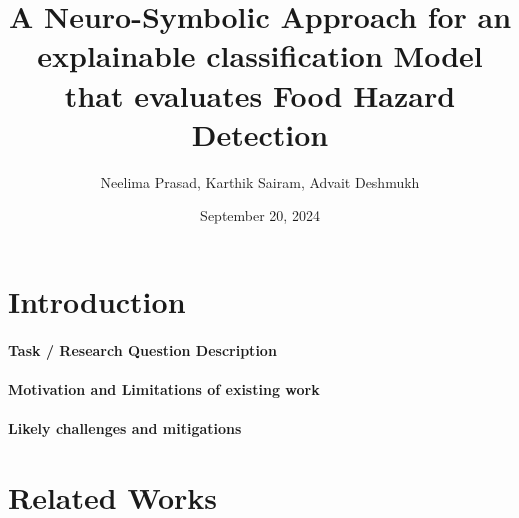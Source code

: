 \documentclass{article}
\title{A Neuro-Symbolic Approach for an explainable classification Model that evaluates Food Hazard Detection  }
\author{Neelima Prasad, Karthik Sairam, Advait Deshmukh}
\date{September 20, 2024}
\begin{document}
\maketitle

\section{Introduction}

\paragraph{Task / Research Question Description}
\paragraph{Motivation and Limitations of existing work}
\paragraph{Likely challenges and mitigations}

\section{Related Works}
\end{document}
